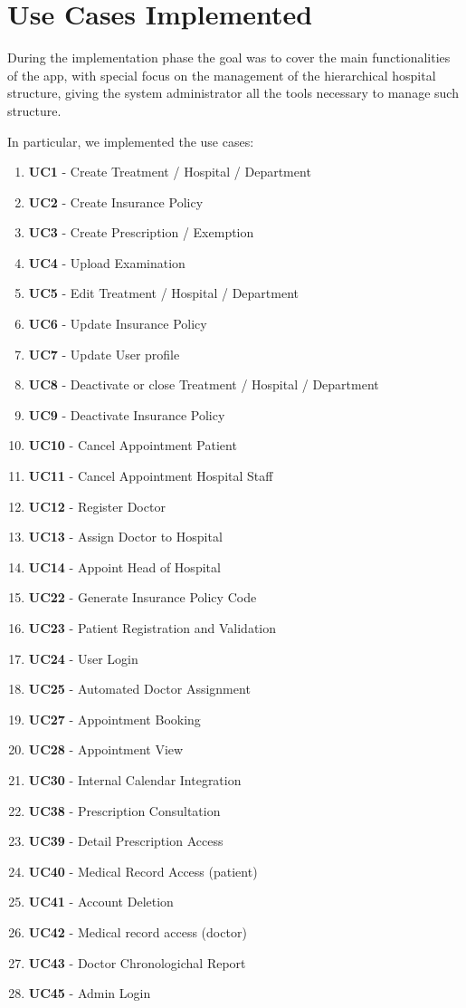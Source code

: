 \section{Use Cases Implemented}
During the implementation phase the goal was to cover the main functionalities of the app, with special focus on the management of the hierarchical hospital structure, giving the system administrator all the tools necessary to manage such structure.

In particular, we implemented the use cases:

\begin{enumerate}
    \item \textbf{UC1} - Create Treatment / Hospital / Department 
    \item \textbf{UC2} - Create Insurance Policy 
    \item \textbf{UC3} - Create Prescription / Exemption
    \item \textbf{UC4} - Upload Examination
    \item \textbf{UC5} - Edit Treatment / Hospital / Department 
    \item \textbf{UC6} - Update Insurance Policy    
    \item \textbf{UC7} - Update User profile
    \item \textbf{UC8} - Deactivate or close Treatment / Hospital / Department  
    \item \textbf{UC9} - Deactivate Insurance Policy    
    \item \textbf{UC10} - Cancel Appointment Patient
    \item \textbf{UC11} - Cancel Appointment Hospital Staff
    \item \textbf{UC12} - Register Doctor
    \item \textbf{UC13} - Assign Doctor to Hospital 
    \item \textbf{UC14} - Appoint Head of Hospital  
    \item \textbf{UC22} - Generate Insurance Policy Code 
    \item \textbf{UC23} - Patient Registration and Validation
    \item \textbf{UC24} - User Login  
    \item \textbf{UC25} - Automated Doctor Assignment 
    \item \textbf{UC27} - Appointment Booking 
    \item \textbf{UC28} - Appointment View 
    \item \textbf{UC30} - Internal Calendar Integration 
    \item \textbf{UC38} - Prescription Consultation
    \item \textbf{UC39} - Detail Prescription Access
    \item \textbf{UC40} - Medical Record Access (patient) 
    \item \textbf{UC41} - Account Deletion 
    \item \textbf{UC42} - Medical record access (doctor) 
    \item \textbf{UC43} - Doctor Chronologichal Report
    \item \textbf{UC45} - Admin Login
\end{enumerate}

